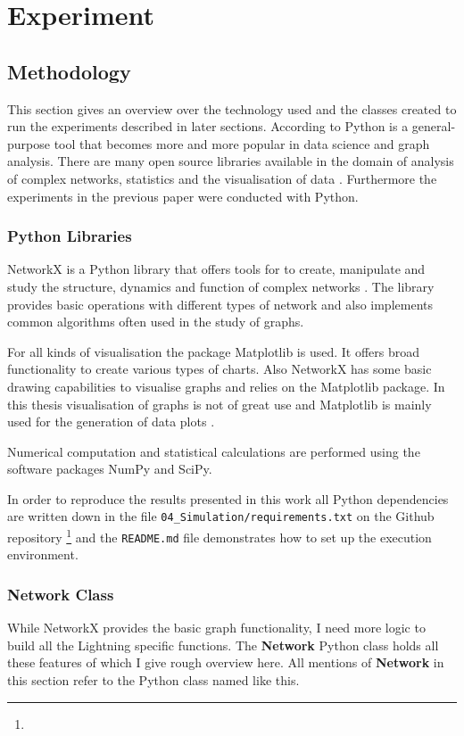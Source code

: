 \documentclass[final]{fhnwreport}       %
\begin{document}
\section{Experiment}\label{sec:method}
\subsection{Methodology}
This section gives an overview over the technology used and the classes created to run the experiments described in later sections. According to \citeauthor{al-taie_python_2017} Python is a general-purpose tool that becomes more and more popular in data science and graph analysis. There are many open source libraries available in the domain of analysis of complex networks, statistics and the visualisation of data \citep{al-taie_python_2017}. Furthermore the experiments in the previous paper were conducted with Python. 

\subsubsection{Python Libraries}
NetworkX is a Python library that offers tools for to create, manipulate and study the structure, dynamics and function of complex networks \citep{al-taie_python_2017}. The library provides basic operations with different types of network and also implements common algorithms often used in the study of graphs.  

For all kinds of visualisation the package Matplotlib is used. It offers broad functionality to create various types of charts. Also NetworkX has some basic drawing capabilities to visualise graphs and relies on the Matplotlib package. In this thesis visualisation of graphs is not of great use and Matplotlib is mainly used for the generation of data plots \citep{al-taie_python_2017}.

Numerical computation and statistical calculations are performed using the software packages NumPy and SciPy. 

In order to reproduce the results presented in this work all Python dependencies are written down in the file \texttt{04\_Simulation/requirements.txt} on the Github repository \footnote{\github} and the \texttt{README.md} file demonstrates how to set up the execution environment.

\subsubsection{Network Class}
While NetworkX provides the basic graph functionality, I need more logic to build all the Lightning specific functions. The \textbf{Network} Python class holds all these features of which I give rough overview here. All mentions of \textbf{Network} in this section refer to the Python class named like this.
\end{document}
